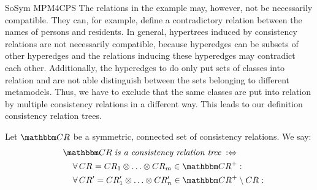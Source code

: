 \begin{copiedFrom}{SoSym MPM4CPS}
The relations in the example may, however, not be necessarily compatible.
They can, for example, define a contradictory relation between the names of persons and residents.
In general, hypertrees induced by consistency relations are not necessarily compatible, because hyperedges can be subsets of other hyperedges and the relations inducing these hyperedges may contradict each other.
Additionally, the hyperedges to do only put sets of classes into relation and are not able distinguish between the sets belonging to different metamodels.
Thus, we have to exclude that the same classes are put into relation by multiple consistency relations in a different way.
This leads to our definition consistency relation trees.

\begin{definition} \label{def:relationtree}
    Let $\consistencyrelationset{CR}$ be a symmetric, connected set of consistency relations. 
    We say:
    \begin{align*}
        \formulaskip &
        \consistencyrelationset{CR} \mathtext{is a consistency relation tree} \equivalentperdefinition \\
        & \formulaskip
        \forall \consistencyrelation{CR}{} = \consistencyrelation{CR}{1} \concat \dots \concat \consistencyrelation{CR}{m}  \in \transitiveclosure{\consistencyrelationset{CR}} : \\
        & \formulaskip
        \forall \consistencyrelation{CR'}{} = \consistencyrelation{CR'}{1} \concat \dots \concat \consistencyrelation{CR'}{n} \in \transitiveclosure{\consistencyrelationset{CR}} \setminus \consistencyrelation{CR}{} : \\
        & \formulaskip\formulaskip

\end{align*}
\end{definition}
\end{copiedFrom}
